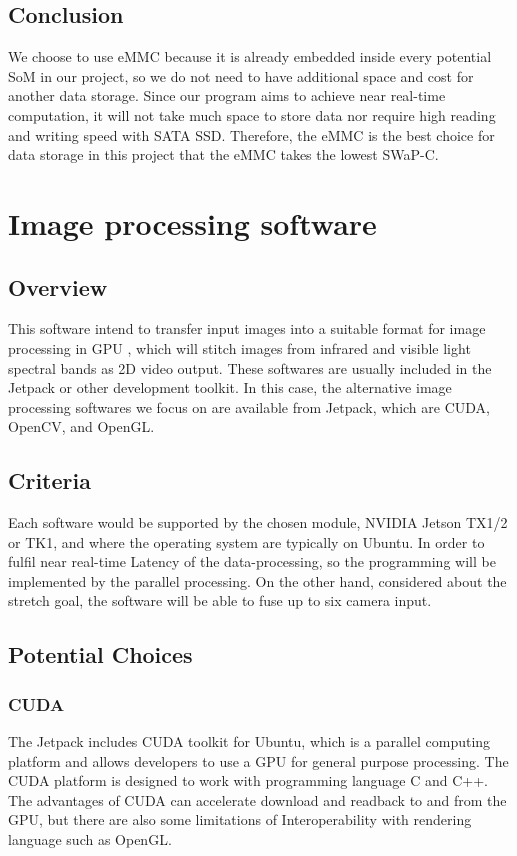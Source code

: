 \documentclass[letterpaper,10pt,serif,draftclsnofoot,onecolumn,compsoc,titlepage]{IEEEtran}
\begin{document}
\subsection{Conclusion}
We choose to use eMMC because it is already embedded inside every potential SoM in our project, so we do 
not need to have additional space and cost for another data storage. Since our program aims to achieve 
near real-time computation, it will not take much space to store data nor require high reading and 
writing speed with SATA SSD. Therefore, the eMMC is the best choice for data storage in this project that 
the eMMC takes the lowest SWaP-C.\\



\section{Image processing software}
\subsection{Overview}
This software intend to transfer input images into a suitable format for image processing in GPU
, which will stitch images from infrared and visible light spectral bands as 2D video output. 
These softwares are usually included in the Jetpack or other development toolkit. In this case, 
the alternative image processing softwares we focus on are available from Jetpack, which are CUDA, 
OpenCV, and OpenGL.\\

\subsection{Criteria}
Each software would be supported by the chosen module, NVIDIA Jetson TX1/2 or TK1, and where 
the operating system are typically on Ubuntu. In order to fulfil near real-time Latency of 
the data-processing, so the programming will be implemented by the parallel processing. On 
the other hand, considered about the stretch goal, the software will be able to fuse up to 
six camera input.\\

\subsection{Potential Choices}
\subsubsection{CUDA}
The Jetpack includes CUDA toolkit for Ubuntu, which is a parallel computing platform and 
allows developers to use a GPU for general purpose processing. The CUDA platform is designed 
to work with programming language C and C++. The advantages of CUDA can accelerate download 
and readback to and from the GPU, but there are also some limitations of Interoperability 
with rendering language such as OpenGL.\\
\end{document}
